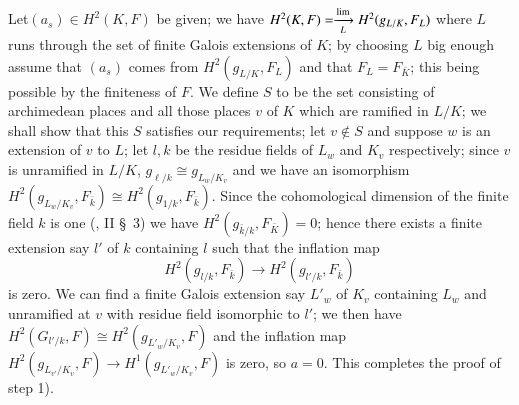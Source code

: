 \begin{step}%
 Let\pageoriginale $(a_s) \in H^2(K,F)$ be given; we have $H^2(K,F)=
 \xrightarrow[L]{\lim} H^2(g_{L/K},\break F_L)$ where $L$ runs through the set of
 finite Galois extensions of $K$; by choosing $L$ big enough assume
 that $(a_s)$ comes from $H^2(g_{L/K}, F_L)$ and that $F_L=
 F_{\bar{K}}$; this being possible by the finiteness of $F$. We define
 $S$ to be the set consisting of archimedean places and all those
 places $v$ of $K$ which are ramified in $L/K$; we shall show that
 this $S$ satisfies our requirements; let $v \notin S$ and suppose $w$
 is an extension of $v$ to $L$; let $l,k$ be the residue fields of
 $L_w$ and $K_v$ respectively; since $v$ is unramified in $L/K$,
 $g_{\ell/k} \cong g_{L_w/K_v}$ and we have an isomorphism $H^2(g_{L_w
   /K_v}, F_{\bar{k}}) \cong H^2(g_{1/k}, F_{\bar{k}})$. Since the
 cohomological dimension of the 
 finite field $k$ is one (\cite{keyS2}, II \S~3) we have $H^2
 (g_{\bar{k}/k}, F_{\bar{K}})=0$; hence there exists a finite extension
 say $l'$ of $k$ containing $l$ such that the inflation map 
 $$
 H^2 (g_{l/k}, F_{\bar{k}}) \longrightarrow H^2 (g_{{l'}/k}, F_{\bar{k}})
 $$
 is zero. We can find a finite Galois extension say $L'_w$ of $K_v$
 containing $L_w$ and unramified at $v$ with residue field isomorphic
 to $l'$; we then have $H^2(G_{l'/k},F) \cong H^2(g_{L'_w/K_v}, F)$ and
 the inflation map $H^2(g_{L_{v'}/K_v}, F) \longrightarrow H^1(g_{L'_w
   /K_v}, F)$ is zero, so $a=0$. This completes the proof of step
 1). 
\end{step}

